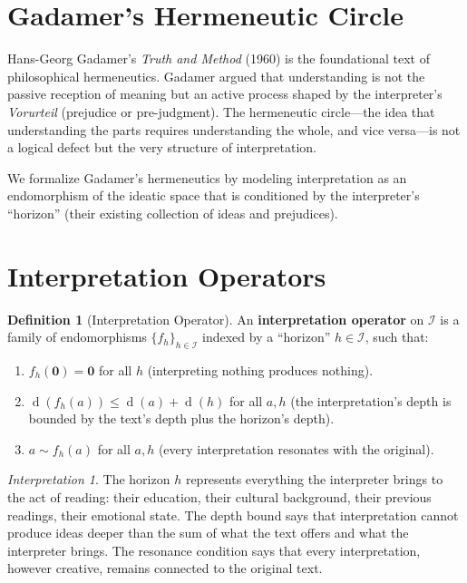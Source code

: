 \documentclass[11pt,openany]{book}
\theoremstyle{definition}
\newtheorem{definition}[axiom]{Definition}
\theoremstyle{plain}
\theoremstyle{remark}
\newtheorem{interpretation}[axiom]{Interpretation}
\newcommand{\IS}{\mathcal{I}}               %
\newcommand{\void}{\mathbf{0}}              %
\newcommand{\res}{\sim}                      %
\newcommand{\depth}{\operatorname{d}}       %
\begin{document}
\section{Gadamer's Hermeneutic Circle}

Hans-Georg Gadamer's \emph{Truth and Method} (1960) is the foundational text of philosophical hermeneutics. Gadamer argued that understanding is not the passive reception of meaning but an active process shaped by the interpreter's \emph{Vorurteil} (prejudice or pre-judgment). The hermeneutic circle---the idea that understanding the parts requires understanding the whole, and vice versa---is not a logical defect but the very structure of interpretation.

We formalize Gadamer's hermeneutics by modeling interpretation as an endomorphism of the ideatic space that is conditioned by the interpreter's ``horizon'' (their existing collection of ideas and prejudices).

\section{Interpretation Operators}

\begin{definition}[Interpretation Operator]
An \textbf{interpretation operator} on $\IS$ is a family of endomorphisms $\{f_h\}_{h \in \IS}$ indexed by a ``horizon'' $h \in \IS$, such that:
\begin{enumerate}
\item $f_h(\void) = \void$ for all $h$ (interpreting nothing produces nothing).
\item $\depth(f_h(a)) \leq \depth(a) + \depth(h)$ for all $a, h$ (the interpretation's depth is bounded by the text's depth plus the horizon's depth).
\item $a \res f_h(a)$ for all $a, h$ (every interpretation resonates with the original).
\end{enumerate}
\end{definition}

\begin{interpretation}
The horizon $h$ represents everything the interpreter brings to the act of reading: their education, their cultural background, their previous readings, their emotional state. The depth bound says that interpretation cannot produce ideas deeper than the sum of what the text offers and what the interpreter brings. The resonance condition says that every interpretation, however creative, remains connected to the original text.
\end{interpretation}
\end{document}
